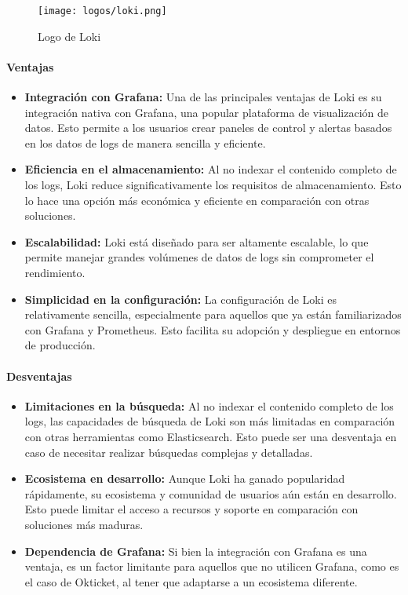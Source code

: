 \begin{figure}[H]
	\centering
	\texttt{[image: logos/loki.png]}
	\caption{Logo de Loki~\textregistered}
\end{figure}

\paragraph{Ventajas}
\begin{itemize}
    \item \textbf{Integración con Grafana:} Una de las principales ventajas de
		Loki es su integración nativa con Grafana, una popular plataforma de
		visualización de datos. Esto permite a los usuarios crear paneles de
		control y alertas basados en los datos de logs de manera sencilla y
		eficiente.
    \item \textbf{Eficiencia en el almacenamiento:} Al no indexar el contenido
		completo de los logs, Loki reduce significativamente los requisitos de
		almacenamiento. Esto lo hace una opción más económica y eficiente en
		comparación con otras soluciones.
    \item \textbf{Escalabilidad:} Loki está diseñado para ser altamente
		escalable, lo que permite manejar grandes volúmenes de datos de logs sin
		comprometer el rendimiento.
    \item \textbf{Simplicidad en la configuración:} La configuración de Loki es
		relativamente sencilla, especialmente para aquellos que ya están
		familiarizados con Grafana y Prometheus. Esto facilita su adopción y
		despliegue en entornos de producción.
\end{itemize}

\newpage{}
\paragraph{Desventajas}
\begin{itemize}
    \item \textbf{Limitaciones en la búsqueda:} Al no indexar el contenido
		completo de los logs, las capacidades de búsqueda de Loki son más
		limitadas en comparación con otras herramientas como Elasticsearch.
		Esto puede ser una desventaja en caso de necesitar realizar búsquedas
		complejas y detalladas.
    \item \textbf{Ecosistema en desarrollo:} Aunque Loki ha ganado popularidad
		rápidamente, su ecosistema y comunidad de usuarios aún están en
		desarrollo. Esto puede limitar el acceso a recursos y soporte en
		comparación con soluciones más maduras.
    \item \textbf{Dependencia de Grafana:} Si bien la integración con Grafana es
		una ventaja, es un factor limitante para aquellos que no utilicen
		Grafana, como es el caso de Okticket, al tener que adaptarse a un
		ecosistema diferente.
\end{itemize}

